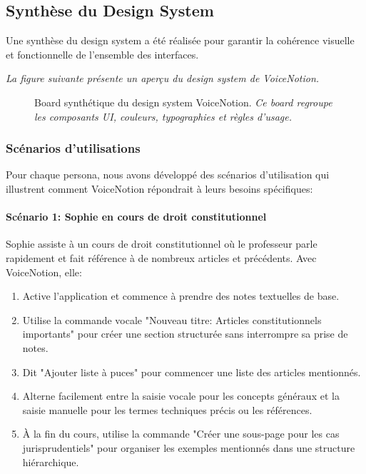\subsection{Synthèse du Design System}

Une synthèse du design system a été réalisée pour garantir la cohérence visuelle et fonctionnelle de l'ensemble des interfaces.

\noindent
\textit{La figure suivante présente un aperçu du design system de VoiceNotion.}
\begin{figure}[H]
    \centering
    \caption{Board synthétique du design system VoiceNotion. \newline\textit{Ce board regroupe les composants UI, couleurs, typographies et règles d'usage.}}
    \label{fig:design_system_board}
\end{figure}

\subsubsection{Scénarios d'utilisations}

Pour chaque persona, nous avons développé des scénarios d'utilisation qui illustrent comment VoiceNotion répondrait à leurs besoins spécifiques:

\paragraph{Scénario 1: Sophie en cours de droit constitutionnel}

Sophie assiste à un cours de droit constitutionnel où le professeur parle rapidement et fait référence à de nombreux articles et précédents. Avec VoiceNotion, elle:
\begin{enumerate}
    \item Active l'application et commence à prendre des notes textuelles de base.
    \item Utilise la commande vocale "Nouveau titre: Articles constitutionnels importants" pour créer une section structurée sans interrompre sa prise de notes.
    \item Dit "Ajouter liste à puces" pour commencer une liste des articles mentionnés.
    \item Alterne facilement entre la saisie vocale pour les concepts généraux et la saisie manuelle pour les termes techniques précis ou les références.
    \item À la fin du cours, utilise la commande "Créer une sous-page pour les cas jurisprudentiels" pour organiser les exemples mentionnés dans une structure hiérarchique.
\end{enumerate}

